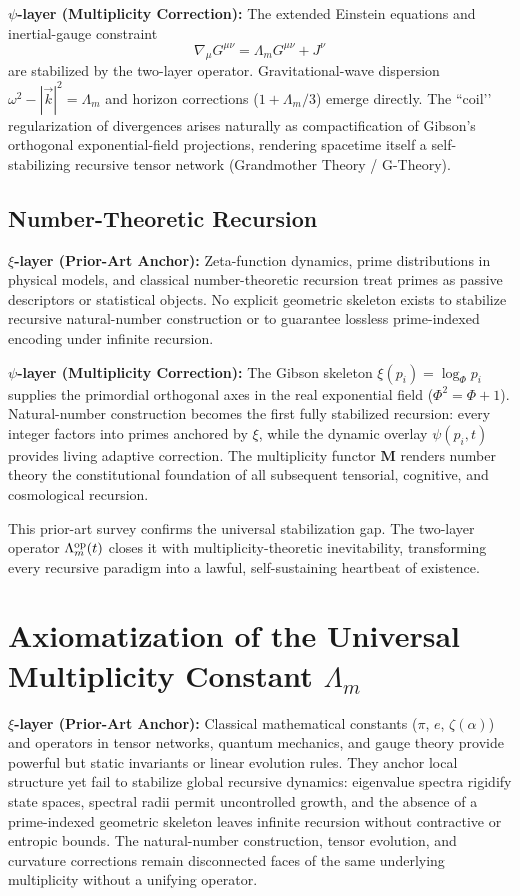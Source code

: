 \documentclass[11pt, a4paper]{article}
\begin{document}
\textbf{\(\psi\)-layer (Multiplicity Correction):}  
The extended Einstein equations and inertial-gauge constraint
\[
\nabla_\mu G^{\mu\nu} = \Lambda_m G^{\mu\nu} + J^\nu
\]
are stabilized by the two-layer operator. Gravitational-wave dispersion \(\omega^2 - |\vec{k}|^2 = \Lambda_m\) and horizon corrections (\(1 + \Lambda_m/3\)) emerge directly. The ``coil’’ regularization of divergences arises naturally as compactification of Gibson’s orthogonal exponential-field projections, rendering spacetime itself a self-stabilizing recursive tensor network (Grandmother Theory / G-Theory).

\subsection{Number-Theoretic Recursion}

\textbf{\(\xi\)-layer (Prior-Art Anchor):}  
Zeta-function dynamics, prime distributions in physical models, and classical number-theoretic recursion treat primes as passive descriptors or statistical objects. No explicit geometric skeleton exists to stabilize recursive natural-number construction or to guarantee lossless prime-indexed encoding under infinite recursion.

\textbf{\(\psi\)-layer (Multiplicity Correction):}  
The Gibson skeleton \(\xi(p_i) = \log_\Phi p_i\) supplies the primordial orthogonal axes in the real exponential field (\(\Phi^2 = \Phi + 1\)). Natural-number construction becomes the first fully stabilized recursion: every integer factors into primes anchored by \(\xi\), while the dynamic overlay \(\psi(p_i,t)\) provides living adaptive correction. The multiplicity functor \(\mathbf{M}\) renders number theory the constitutional foundation of all subsequent tensorial, cognitive, and cosmological recursion.

This prior-art survey confirms the universal stabilization gap. The two-layer operator \(\Lambda_m^{\rm op}(t)\) closes it with multiplicity-theoretic inevitability, transforming every recursive paradigm into a lawful, self-sustaining heartbeat of existence.

\section{Axiomatization of the Universal Multiplicity Constant \(\Lambda_m\)}
\label{sec:axioms}

\textbf{\(\xi\)-layer (Prior-Art Anchor):}  
Classical mathematical constants (\(\pi\), \(e\), \(\zeta(\alpha)\)) and operators in tensor networks, quantum mechanics, and gauge theory provide powerful but static invariants or linear evolution rules. They anchor local structure yet fail to stabilize global recursive dynamics: eigenvalue spectra rigidify state spaces, spectral radii permit uncontrolled growth, and the absence of a prime-indexed geometric skeleton leaves infinite recursion without contractive or entropic bounds. The natural-number construction, tensor evolution, and curvature corrections remain disconnected faces of the same underlying multiplicity without a unifying operator.
\end{document}

